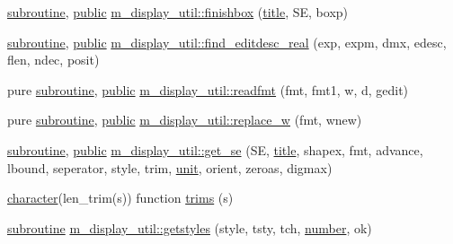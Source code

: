 \begin{DoxyCompactItemize}
\item 
\hyperlink{M__stopwatch_83_8txt_acfbcff50169d691ff02d4a123ed70482}{subroutine}, \hyperlink{M__stopwatch_83_8txt_a2f74811300c361e53b430611a7d1769f}{public} \hyperlink{namespacem__display__util_a056732cc150994b9abe25ed0d72ebee4}{m\+\_\+display\+\_\+util\+::finishbox} (\hyperlink{print__watch_83_8txt_a15b5bd21156bb9fca6a755ab8c029a9c}{title}, SE, boxp)
\item 
\hyperlink{M__stopwatch_83_8txt_acfbcff50169d691ff02d4a123ed70482}{subroutine}, \hyperlink{M__stopwatch_83_8txt_a2f74811300c361e53b430611a7d1769f}{public} \hyperlink{namespacem__display__util_abcd2aebb4cd373005b4d1fc4359a2d01}{m\+\_\+display\+\_\+util\+::find\+\_\+editdesc\+\_\+real} (exp, expm, dmx, edesc, flen, ndec, posit)
\item 
pure \hyperlink{M__stopwatch_83_8txt_acfbcff50169d691ff02d4a123ed70482}{subroutine}, \hyperlink{M__stopwatch_83_8txt_a2f74811300c361e53b430611a7d1769f}{public} \hyperlink{namespacem__display__util_a73ae4e30d2dcf1f608ac24bf1623ee6c}{m\+\_\+display\+\_\+util\+::readfmt} (fmt, fmt1, w, d, gedit)
\item 
pure \hyperlink{M__stopwatch_83_8txt_acfbcff50169d691ff02d4a123ed70482}{subroutine}, \hyperlink{M__stopwatch_83_8txt_a2f74811300c361e53b430611a7d1769f}{public} \hyperlink{namespacem__display__util_a76a458454b83026c12d4a90882f2719e}{m\+\_\+display\+\_\+util\+::replace\+\_\+w} (fmt, wnew)
\item 
\hyperlink{M__stopwatch_83_8txt_acfbcff50169d691ff02d4a123ed70482}{subroutine}, \hyperlink{M__stopwatch_83_8txt_a2f74811300c361e53b430611a7d1769f}{public} \hyperlink{namespacem__display__util_a04585c4fe921b2423a6cfc1ad21a40b7}{m\+\_\+display\+\_\+util\+::get\+\_\+se} (SE, \hyperlink{print__watch_83_8txt_a15b5bd21156bb9fca6a755ab8c029a9c}{title}, shapex, fmt, advance, lbound, seperator, style, trim, \hyperlink{M__stopwatch_83_8txt_a5cbef30eb7c0d734bd82f5a7ebea9aa7}{unit}, orient, zeroas, digmax)
\item 
\hyperlink{option__stopwatch_83_8txt_abd4b21fbbd175834027b5224bfe97e66}{character}(len\+\_\+trim(s)) function \hyperlink{M__display_8f90_a18d4b146c386b49bb8b6512c91988ae3}{trims} (s)
\item 
\hyperlink{M__stopwatch_83_8txt_acfbcff50169d691ff02d4a123ed70482}{subroutine} \hyperlink{namespacem__display__util_a692b7279b1883d8139b60e480aa1e430}{m\+\_\+display\+\_\+util\+::getstyles} (style, tsty, tch, \hyperlink{what__overview_81_8txt_a5168680dcac08de182f59de9a12c38ae}{number}, ok)
\item 

\end{DoxyCompactItemize}
